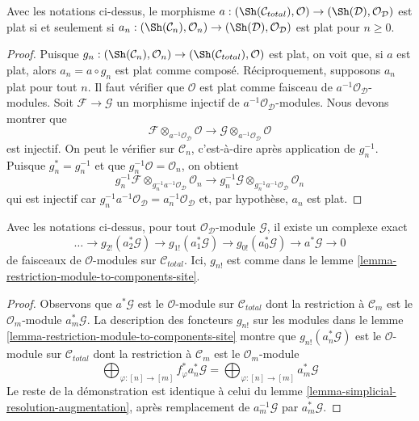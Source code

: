 \begin{lemma}
\label{lemma-flat-augmentation-modules}
Avec les notations ci-dessus, le morphisme
$a : (\Sh(\mathcal{C}_{total}), \mathcal{O}) \to
(\Sh(\mathcal{D}), \mathcal{O}_\mathcal{D})$
est plat si et seulement si
$a_n : (\Sh(\mathcal{C}_n), \mathcal{O}_n) \to
(\Sh(\mathcal{D}), \mathcal{O}_\mathcal{D})$
est plat pour $n \geq 0$.
\end{lemma}

\begin{proof}
Puisque $g_n : (\Sh(\mathcal{C}_n), \mathcal{O}_n) \to
(\Sh(\mathcal{C}_{total}), \mathcal{O})$ est plat, on voit
que, si $a$ est plat, alors $a_n = a \circ g_n$ est plat comme
composé. Réciproquement, supposons $a_n$ plat pour tout $n$.
Il faut vérifier que $\mathcal{O}$ est plat comme faisceau de
$a^{-1}\mathcal{O}_\mathcal{D}$-modules. Soit $\mathcal{F} \to \mathcal{G}$
un morphisme injectif de $a^{-1}\mathcal{O}_\mathcal{D}$-modules.
Nous devons montrer que
$$
\mathcal{F} \otimes_{a^{-1}\mathcal{O}_\mathcal{D}} \mathcal{O}
\to
\mathcal{G} \otimes_{a^{-1}\mathcal{O}_\mathcal{D}} \mathcal{O}
$$
est injectif. On peut le vérifier sur $\mathcal{C}_n$, c'est-à-dire après
application de $g_n^{-1}$. Puisque $g_n^* = g_n^{-1}$ et que
$g_n^{-1}\mathcal{O} = \mathcal{O}_n$, on obtient
$$
g_n^{-1}\mathcal{F} \otimes_{g_n^{-1}a^{-1}\mathcal{O}_\mathcal{D}}
\mathcal{O}_n
\to
g_n^{-1}\mathcal{G} \otimes_{g_n^{-1}a^{-1}\mathcal{O}_\mathcal{D}}
\mathcal{O}_n
$$
qui est injectif car
$g_n^{-1}a^{-1}\mathcal{O}_\mathcal{D} = a_n^{-1}\mathcal{O}_\mathcal{D}$
et, par hypothèse, $a_n$ est plat.
\end{proof}

\begin{lemma}
\label{lemma-simplicial-resolution-augmentation-modules}
Avec les notations ci-dessus, pour tout $\mathcal{O}_\mathcal{D}$-module $\mathcal{G}$,
il existe un complexe exact
$$
\ldots \to
g_{2!}(a_2^*\mathcal{G}) \to
g_{1!}(a_1^*\mathcal{G}) \to
g_{0!}(a_0^*\mathcal{G}) \to
a^*\mathcal{G} \to 0
$$
de faisceaux de $\mathcal{O}$-modules sur $\mathcal{C}_{total}$.
Ici, $g_{n!}$ est comme dans le lemme \ref{lemma-restriction-module-to-components-site}.
\end{lemma}

\begin{proof}
Observons que $a^*\mathcal{G}$ est le $\mathcal{O}$-module sur
$\mathcal{C}_{total}$ dont la restriction à $\mathcal{C}_m$
est le $\mathcal{O}_m$-module $a_m^*\mathcal{G}$.
La description des foncteurs $g_{n!}$ sur les modules
dans le lemme \ref{lemma-restriction-module-to-components-site}
montre que $g_{n!}(a_n^*\mathcal{G})$ est le
$\mathcal{O}$-module sur $\mathcal{C}_{total}$
dont la restriction à $\mathcal{C}_m$ est le $\mathcal{O}_m$-module
$$
\bigoplus\nolimits_{\varphi : [n] \to [m]} f_\varphi^*a_n^*\mathcal{G} =
\bigoplus\nolimits_{\varphi : [n] \to [m]} a_m^*\mathcal{G}
$$
Le reste de la démonstration est identique à celui du lemme
\ref{lemma-simplicial-resolution-augmentation},
après remplacement de $a_m^{-1}\mathcal{G}$ par $a_m^*\mathcal{G}$.
\end{proof}

